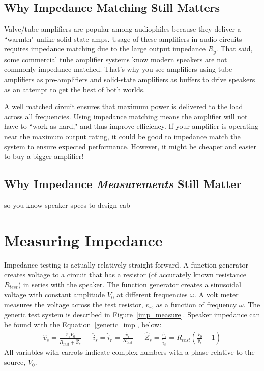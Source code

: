 \documentclass[10pt]{book}
\begin{document}
\subsection{Why Impedance Matching Still Matters}
Valve/tube amplifiers are popular among audiophiles because they deliver a ``warmth" unlike solid-state amps. Usage of these amplifiers in audio circuits requires impedance matching due to the large output impedance $R_g$. That said, some commercial tube amplifier systems know modern speakers are not commonly impedance matched. That's why you see amplifiers using tube amplifiers as pre-amplifiers and solid-state amplifiers as buffers to drive speakers as an attempt to get the best of both worlds.

A well matched circuit ensures that maximum power is delivered to the load across all frequencies. Using impedance matching means the amplifier will not have to ``work as hard," and thus improve efficiency. If your amplifier is operating near the maximum output rating, it could be good to impedance match the system to ensure expected performance. However, it might be cheaper and easier to buy a bigger amplifier!

\subsection{Why Impedance \textit{Measurements} Still Matter}
so you know speaker specs to design cab

\section{Measuring Impedance}
Impedance testing is actually relatively straight forward. A function generator creates voltage to a circuit that has a resistor (of accurately known resistance $R_{test}$) in series with the speaker. The function generator creates a sinusoidal voltage with constant amplitude $V_0$ at different frequencies $\omega$. A volt meter measures the voltage across the test resistor, $v_r$, as a function of frequency $\omega$. The generic test system is described in Figure~\ref{imp_measure}. Speaker impedance can be found with the Equation~\ref{generic_imp}, below:
\begin{align}\label{generic_imp}
\hat{v}_s=\frac{ \hat{Z}_s V_0 }{ R_{test} + \hat{Z}_s } && \hat{i}_s=\hat{i}_r=\frac{\hat{v}_r}{R_{test}} && \hat{Z}_s=\frac{\hat{v}_s}{\hat{i}_s}=R_{test}\left( \frac{V_0}{\hat{v}_r} -1 \right)
\end{align}
All variables with carrots indicate complex numbers with a phase relative to the source, $V_0$.
\end{document}
